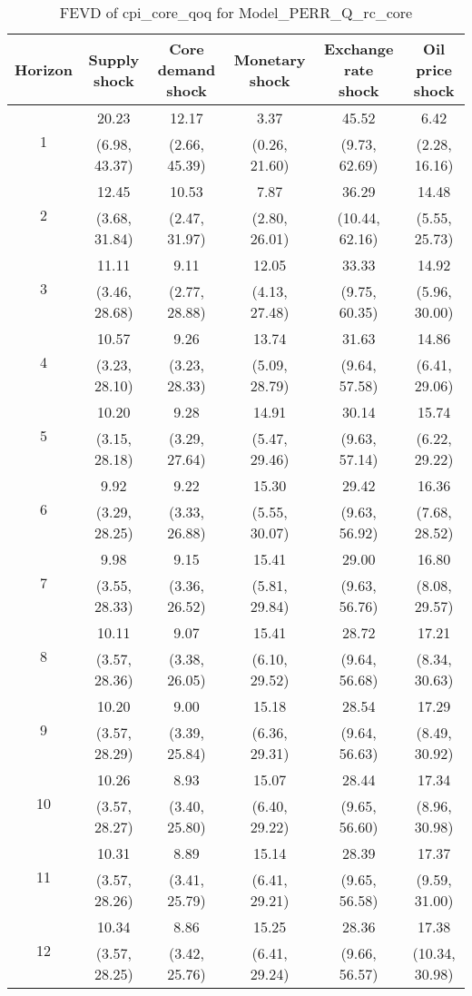 \documentclass{article}
\begin{document}
\begin{table}
	\footnotesize
	\caption{FEVD of cpi_core_qoq for Model_PERR_Q_rc_core}
	\begin{tabular}{cccccc}
		Horizon & Supply shock & Core demand shock & Monetary shock & Exchange rate shock & Oil price shock\\ \hline
		\multirow{2}{*}{1} & 20.23 & 12.17 & 3.37 & 45.52 & 6.42\\
		 & (6.98, 43.37) & (2.66, 45.39) & (0.26, 21.60) & (9.73, 62.69) & (2.28, 16.16)\\
		\multirow{2}{*}{2} & 12.45 & 10.53 & 7.87 & 36.29 & 14.48\\
		 & (3.68, 31.84) & (2.47, 31.97) & (2.80, 26.01) & (10.44, 62.16) & (5.55, 25.73)\\
		\multirow{2}{*}{3} & 11.11 & 9.11 & 12.05 & 33.33 & 14.92\\
		 & (3.46, 28.68) & (2.77, 28.88) & (4.13, 27.48) & (9.75, 60.35) & (5.96, 30.00)\\
		\multirow{2}{*}{4} & 10.57 & 9.26 & 13.74 & 31.63 & 14.86\\
		 & (3.23, 28.10) & (3.23, 28.33) & (5.09, 28.79) & (9.64, 57.58) & (6.41, 29.06)\\
		\multirow{2}{*}{5} & 10.20 & 9.28 & 14.91 & 30.14 & 15.74\\
		 & (3.15, 28.18) & (3.29, 27.64) & (5.47, 29.46) & (9.63, 57.14) & (6.22, 29.22)\\
		\multirow{2}{*}{6} & 9.92 & 9.22 & 15.30 & 29.42 & 16.36\\
		 & (3.29, 28.25) & (3.33, 26.88) & (5.55, 30.07) & (9.63, 56.92) & (7.68, 28.52)\\
		\multirow{2}{*}{7} & 9.98 & 9.15 & 15.41 & 29.00 & 16.80\\
		 & (3.55, 28.33) & (3.36, 26.52) & (5.81, 29.84) & (9.63, 56.76) & (8.08, 29.57)\\
		\multirow{2}{*}{8} & 10.11 & 9.07 & 15.41 & 28.72 & 17.21\\
		 & (3.57, 28.36) & (3.38, 26.05) & (6.10, 29.52) & (9.64, 56.68) & (8.34, 30.63)\\
		\multirow{2}{*}{9} & 10.20 & 9.00 & 15.18 & 28.54 & 17.29\\
		 & (3.57, 28.29) & (3.39, 25.84) & (6.36, 29.31) & (9.64, 56.63) & (8.49, 30.92)\\
		\multirow{2}{*}{10} & 10.26 & 8.93 & 15.07 & 28.44 & 17.34\\
		 & (3.57, 28.27) & (3.40, 25.80) & (6.40, 29.22) & (9.65, 56.60) & (8.96, 30.98)\\
		\multirow{2}{*}{11} & 10.31 & 8.89 & 15.14 & 28.39 & 17.37\\
		 & (3.57, 28.26) & (3.41, 25.79) & (6.41, 29.21) & (9.65, 56.58) & (9.59, 31.00)\\
		\multirow{2}{*}{12} & 10.34 & 8.86 & 15.25 & 28.36 & 17.38\\
		 & (3.57, 28.25) & (3.42, 25.76) & (6.41, 29.24) & (9.66, 56.57) & (10.34, 30.98)\\
	\end{tabular}
\label{tab:fevd-Model_PERR_Q_rc_core-cpi_core_qoq}
\end{table}
\end{document}
